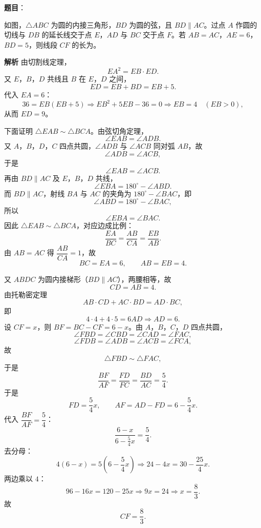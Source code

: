 \begin{answer}

\textbf{题目}：

如图，$\triangle ABC$ 为圆的内接三角形，$BD$ 为圆的弦，且 $BD\parallel AC$。过点 $A$ 作圆的切线与 $DB$ 的延长线交于点 $E$，$AD$ 与 $BC$ 交于点 $F$。若 $AB=AC$，$AE=6$，$BD=5$，则线段 $CF$ 的长为\gkblank{}。
\nopagebreak[4]
\begin{center}\end{center}
\nopagebreak[4]
\textbf{解析}
由切割线定理，
\nopagebreak[4]
\[EA^2=EB\cdot ED.\]
又 $E$，$B$，$D$ 共线且 $B$ 在 $E$，$D$ 之间，
\nopagebreak[4]
\[ED=EB+BD=EB+5.\]
代入 $EA=6$：
\nopagebreak[4]
\[36=EB(EB+5)\Longrightarrow EB^2+5EB-36=0
\Longrightarrow EB=4\quad(EB>0),\]
从而 $ED=9$。

下面证明 $\triangle EAB\sim\triangle BCA$。由弦切角定理，
\nopagebreak[4]
\[\angle EAB=\angle ADB.\]
又 $A$，$B$，$D$，$C$ 四点共圆，$\angle ADB$ 与 $\angle ACB$ 同对弧 $AB$，故
\nopagebreak[4]
\[\angle ADB=\angle ACB,\]
于是
\nopagebreak[4]
\[\angle EAB=\angle ACB.\]
再由 $BD\parallel AC$ 及 $E$，$B$，$D$ 共线，
\nopagebreak[4]
\[\angle EBA=180^\circ-\angle ABD.\]
而 $BD\parallel AC$，射线 $BA$ 与 $AC$ 的夹角为 $180^\circ-\angle BAC$，即
\nopagebreak[4]
\[\angle ABD=180^\circ-\angle BAC,\]
所以
\nopagebreak[4]
\[\angle EBA=\angle BAC.\]
因此 $\triangle EAB\sim\triangle BCA$，对应边成比例：
\nopagebreak[4]
\[\frac{EA}{BC}=\frac{AB}{CA}=\frac{EB}{AB}.\]
由 $AB=AC$ 得 $\dfrac{AB}{CA}=1$，故
\nopagebreak[4]
\[BC=EA=6,\qquad AB=EB=4.\]

又 $ABDC$ 为圆内接梯形（$BD\parallel AC$），两腰相等，故
\nopagebreak[4]
\[CD=AB=4.\]
由托勒密定理
\nopagebreak[4]
\[AB\cdot CD+AC\cdot BD=AD\cdot BC,\]
即
\nopagebreak[4]
\[4\cdot4+4\cdot5=6AD\Longrightarrow AD=6.\]
设 $CF=x$，则 $BF=BC-CF=6-x$。由 $A$，$B$，$C$，$D$ 四点共圆，
\nopagebreak[4]
\[\angle FBD=\angle CBD=\angle CAD=\angle FAC,\]
\nopagebreak[4]
\[\angle FDB=\angle ADB=\angle ACB=\angle FCA,\]
故
\nopagebreak[4]
\[\triangle FBD\sim\triangle FAC,\]
于是
\nopagebreak[4]
\[\frac{BF}{AF}=\frac{FD}{FC}=\frac{BD}{AC}=\frac54.\]
于是
\nopagebreak[4]
\[FD=\frac54x,\qquad AF=AD-FD=6-\frac54x.\]
代入 $\dfrac{BF}{AF}=\dfrac54$：
\nopagebreak[4]
\[\frac{6-x}{6-\frac54x}=\frac54.\]
去分母：
\nopagebreak[4]
\[4(6-x)=5\left(6-\frac54x\right)
\Longrightarrow 24-4x=30-\frac{25}{4}x.\]
两边乘以 $4$：
\nopagebreak[4]
\[96-16x=120-25x\Longrightarrow 9x=24
\Longrightarrow x=\frac83.\]
故
\nopagebreak[4]
\[CF=\frac83.\]


\end{answer}
